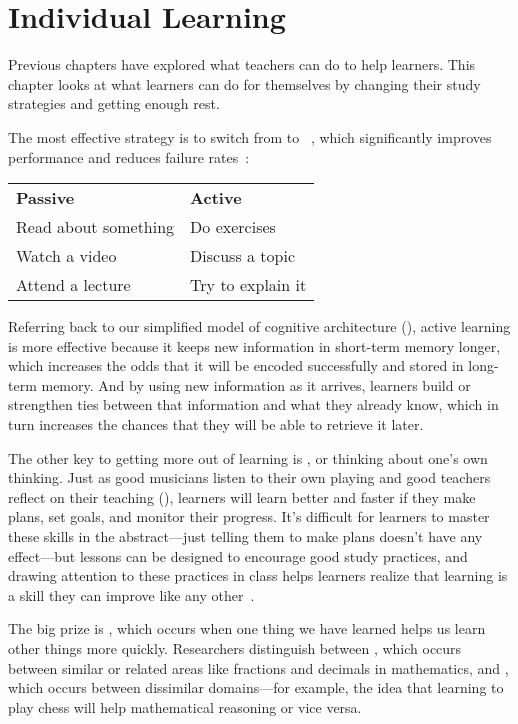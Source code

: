 \chapter{Individual Learning}\label{s:individual}

Previous chapters have explored what teachers can do to help learners.
This chapter looks at what learners can do for themselves
by changing their study strategies and getting enough rest.

The most effective strategy is to switch from 
to ~\cite{Hpl2018},
which significantly improves performance and reduces failure rates~\cite{Free2014}:

\begin{longtable}{ll}
\textbf{Passive}		& \textbf{Active} \\
Read about something		& Do exercises \\
Watch a video			& Discuss a topic \\
Attend a lecture		& Try to explain it
\end{longtable}

\noindent
Referring back to our simplified model of cognitive architecture (),
active learning is more effective because it keeps new information in short-term memory longer,
which increases the odds that it will be encoded successfully and stored in long-term memory.
And by using new information as it arrives,
learners build or strengthen ties between that information and what they already know,
which in turn increases the chances that they will be able to retrieve it later.

The other key to getting more out of learning is ,
or thinking about one's own thinking.
Just as good musicians listen to their own playing
and good teachers reflect on their teaching (),
learners will learn better and faster if they make plans,
set goals,
and monitor their progress.
It's difficult for learners to master these skills in the abstract---just telling them
to make plans doesn't have any effect---but
lessons can be designed to encourage good study practices,
and drawing attention to these practices in class
helps learners realize that learning is a skill they can improve like any other~\cite{McGu2015,Miya2018}.

The big prize is ,
which occurs when one thing we have learned helps us learn other things more quickly.
Researchers distinguish between ,
which occurs between similar or related areas like fractions and decimals in mathematics,
and ,
which occurs between dissimilar domains---for example,
the idea that learning to play chess will help mathematical reasoning or vice versa.

